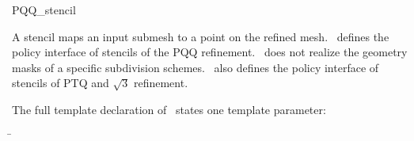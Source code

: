 
\ccRefPageBegin



\begin{ccRefClass}{PQQ_stencil}

\ccDefinition

A stencil maps an input submesh to a point on the refined 
mesh. \ccClassTemplateName\ defines the policy interface of 
stencils of the PQQ refinement. \ccClassTemplateName\ does not
realize the geometry masks of a specific subdivision schemes.
\ccClassTemplateName\ also defines the policy interface 
of stencils of PTQ and $\sqrt{3}$ refinement.




\ccParameters

The full template declaration of \ccClassTemplateName\ states one
template parameter:

\begin{tabbing}
 \=\\
\end{tabbing}
   

\end{ccRefClass}

